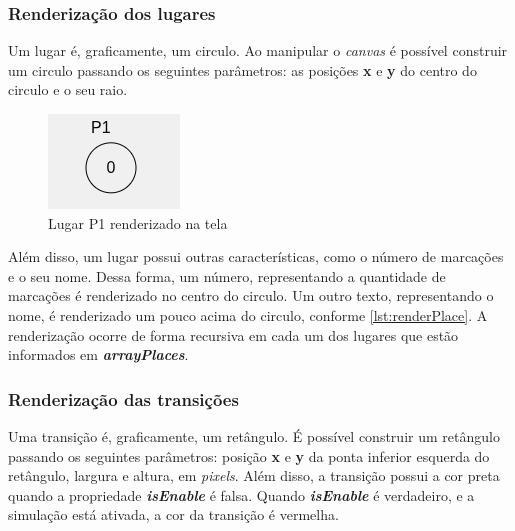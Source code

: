 \documentclass[
	12pt,				%
	openright,			%
	oneside,			%
	a4paper,			%
	english,			%
	brazil				%
	]{abntex2}
\begin{document}
\subsubsection*{Renderização dos lugares}

Um lugar é, graficamente, um circulo. Ao manipular o \textit{canvas} é possível construir um circulo passando os seguintes parâmetros: as posições \textbf{x} e \textbf{y} do centro do circulo e o seu raio. 



\begin{figure}[ht] 
	\centering
	\includegraphics[scale=1]{figuras/renderPlace.png}
	\caption[renderPlace]{Lugar P1 renderizado na tela}
	\label{fig:renderPlace}
\end{figure}
\FloatBarrier

Além disso, um lugar possui outras características, como o número de marcações e o seu nome. Dessa forma, um número, representando a quantidade de marcações é renderizado no centro do circulo. Um outro texto, representando o nome, é renderizado um pouco acima do circulo, conforme \ref{lst:renderPlace}. A renderização ocorre de forma recursiva em cada um dos lugares que estão informados em \textbf{\textit{arrayPlaces}}.

\subsubsection*{Renderização das transições}

Uma transição é, graficamente, um retângulo. É possível construir um retângulo passando os seguintes parâmetros: posição \textbf{x} e \textbf{y} da ponta inferior esquerda do retângulo, largura e altura, em \textit{pixels}. Além disso, a transição possui a cor preta quando a propriedade \textbf{\textit{isEnable}} é falsa. Quando \textbf{\textit{isEnable}} é verdadeiro, e a simulação está ativada, a cor da transição é vermelha. 


\end{document}
